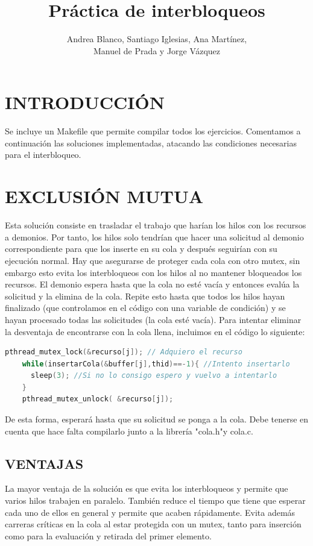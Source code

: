 \documentclass[10 pt,spanish]{article}  %
\title{\LARGE \bf
Práctica de interbloqueos
}
\author{Andrea Blanco, Santiago Iglesias, Ana Martínez, \\
Manuel de Prada y Jorge Vázquez}
\begin{document}
\maketitle

\section{INTRODUCCIÓN}
Se incluye un Makefile que permite compilar todos los ejercicios. Comentamos a continuación las soluciones implementadas, atacando las condiciones necesarias para el interbloqueo.

\section{EXCLUSIÓN MUTUA}
Esta solución consiste en trasladar el trabajo que harían los hilos con los recursos a demonios. Por tanto, los hilos solo tendrían que hacer una solicitud al demonio correspondiente para que los inserte en su cola y después seguirían con su ejecución normal. Hay que asegurarse de proteger cada cola con otro mutex, sin embargo esto evita los interbloqueos con los hilos al no mantener bloqueados los recursos. 
El demonio espera hasta que la cola no esté vacía y entonces evalúa la solicitud y la elimina de la cola. Repite esto hasta que todos los hilos hayan finalizado (que controlamos en el código con una variable de condición) y se hayan procesado todas las solicitudes (la cola esté vacía).
Para intentar eliminar la desventaja de encontrarse con la cola llena, incluimos en el código lo siguiente: 
\begin{lstlisting}[language=C++,caption=Espera para inserción]
    pthread_mutex_lock(&recurso[j]); // Adquiero el recurso
    while(insertarCola(&buffer[j],thid)==-1){ //Intento insertarlo
      sleep(3); //Si no lo consigo espero y vuelvo a intentarlo
    }
    pthread_mutex_unlock( &recurso[j]);
\end{lstlisting}

De esta forma, esperará hasta que su solicitud se ponga a la cola. Debe tenerse en cuenta que hace falta compilarlo junto a la librería "cola.h"y cola.c.
\subsection{VENTAJAS}
La mayor ventaja de la solución es que evita los interbloqueos y permite que varios hilos trabajen en paralelo. También reduce el tiempo que tiene que esperar cada uno de ellos en general y permite que acaben rápidamente. Evita además carreras críticas en la cola al estar protegida con un mutex, tanto para inserción como para la evaluación y retirada del primer elemento.
\end{document}

